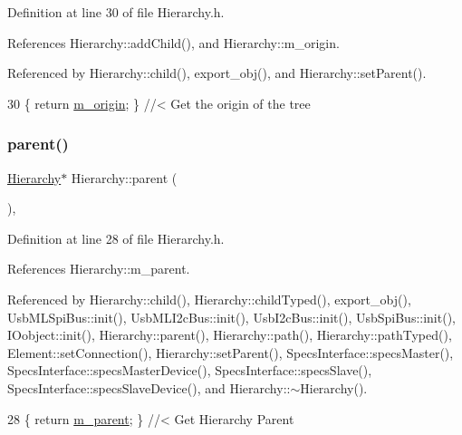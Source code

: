 Definition at line 30 of file Hierarchy.\+h.



References Hierarchy\+::add\+Child(), and Hierarchy\+::m\+\_\+origin.



Referenced by Hierarchy\+::child(), export\+\_\+obj(), and Hierarchy\+::set\+Parent().


\begin{DoxyCode}
30 \{ \textcolor{keywordflow}{return} \hyperlink{classHierarchy_a16c73e557d3a7c156ffb5dc4102d148e}{m\_origin}; \}  \textcolor{comment}{//< Get the origin of the tree}
\end{DoxyCode}
\mbox{\label{classHierarchy_a1c7bec8257e717f9c1465e06ebf845fc}} 
\subsubsection{\texorpdfstring{parent()}{parent()}\hspace{0.1cm}{\footnotesize\ttfamily [1/2]}}
{\footnotesize\ttfamily \hyperlink{classHierarchy}{Hierarchy}$\ast$ Hierarchy\+::parent (\begin{DoxyParamCaption}{ }\end{DoxyParamCaption})\hspace{0.3cm}{\ttfamily [inline]}, {\ttfamily [inherited]}}



Definition at line 28 of file Hierarchy.\+h.



References Hierarchy\+::m\+\_\+parent.



Referenced by Hierarchy\+::child(), Hierarchy\+::child\+Typed(), export\+\_\+obj(), Usb\+M\+L\+Spi\+Bus\+::init(), Usb\+M\+L\+I2c\+Bus\+::init(), Usb\+I2c\+Bus\+::init(), Usb\+Spi\+Bus\+::init(), I\+Oobject\+::init(), Hierarchy\+::parent(), Hierarchy\+::path(), Hierarchy\+::path\+Typed(), Element\+::set\+Connection(), Hierarchy\+::set\+Parent(), Specs\+Interface\+::specs\+Master(), Specs\+Interface\+::specs\+Master\+Device(), Specs\+Interface\+::specs\+Slave(), Specs\+Interface\+::specs\+Slave\+Device(), and Hierarchy\+::$\sim$\+Hierarchy().


\begin{DoxyCode}
28 \{ \textcolor{keywordflow}{return} \hyperlink{classHierarchy_a5814bb280d4e8539ab25ab6cbfb9cc4f}{m\_parent}; \}  \textcolor{comment}{//< Get Hierarchy Parent}
\end{DoxyCode}
\mbox{\label{classHierarchy_ad550588733bf75ac5c0fcfd7c8fd11a6}} 
